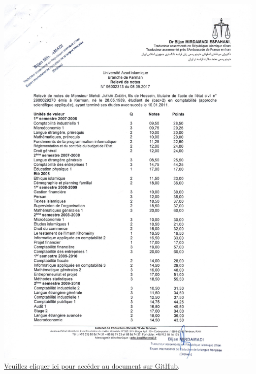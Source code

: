 \documentclass{article}
\begin{document}
        \begin{center}
            \includegraphics[width=\textwidth,height=\textheight,keepaspectratio]{../Document/Education/Accounting/08-05-2017 releve de notes - Comptabilite - P01.jpg}
            \footnotesize
            \href{https://github.com/jafarizadeh/CV---lettre/tree/079f60796b41475881d7ba4a70abc3254d3dd466/Document/Education/Accounting}{Veuillez cliquer ici pour accéder au document sur GitHub}.
        \end{center}
\end{document}
